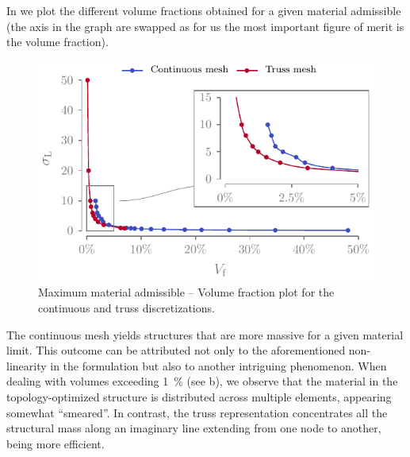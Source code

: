 In  we plot the different volume fractions obtained for a given material admissible (the axis in the graph are swapped as for us the most important figure of merit is the volume fraction).
\begin{figure}
    \centering
    \includegraphics{figures/03_comparison_TO_TTO/15_stress_vol/stress_vol.pdf}
    \caption{Maximum material admissible -- Volume fraction plot for the continuous and truss discretizations.}
    \label{fig:03_stress_vol}
\end{figure}
The continuous mesh yields structures that are more massive for a given material limit. This outcome can be attributed not only to the aforementioned non-linearity in the formulation but also to another intriguing phenomenon. When dealing with volumes exceeding \qty{1}{\percent} (see b), we observe that the material in the topology-optimized structure is distributed across multiple elements, appearing somewhat “smeared”. In contrast, the truss representation concentrates all the structural mass along an imaginary line extending from one node to another, being more efficient.

